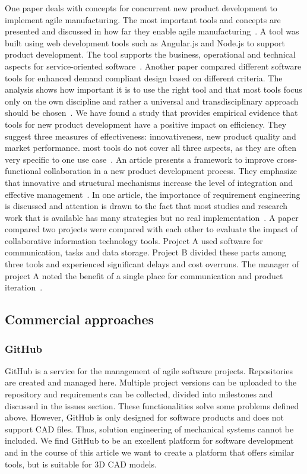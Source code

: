     One paper deals with concepts for concurrent new product development to implement agile manufacturing. The most important tools and concepts are presented and discussed in how far they enable agile manufacturing~\cite{buyukozkan2004survey}.
    A tool was built using web development tools such as Angular.js and Node.js to support product development. The tool supports the business, operational and technical aspects for service-oriented software~\cite{belfadel2022requirements}.
    Another paper compared different software tools for enhanced demand compliant design based on different criteria. The analysis shows how important it is to use the right tool and that most tools focus only on the own discipline and rather a universal and transdisciplinary approach should be chosen~\cite{9447081}.
    We have found a study that provides empirical evidence that tools for new product development have a positive impact on efficiency. They suggest three measures of effectiveness: innovativeness, new product quality and market performance. most tools do not cover all three aspects, as they are often very specific to one use case~\cite{DURMUSOGLU2011321}.
    An article presents a framework to improve cross-functional collaboration in a new product development process. They emphasize that innovative and structural mechanisms increase the level of integration and effective management~\cite{Jassawalla}.
    In one article, the importance of requirement engineering is discussed and attention is drawn to the fact that most studies and research work that is available has many strategies but no real implementation~\cite{kumar2022requirements}.
    A paper compared two projects were compared with each other to evaluate the impact of collaborative information technology tools. Project A used software for communication, tasks and data storage. Project B divided these parts among three tools and experienced significant delays and cost overruns. The manager of project A noted the benefit of a single place for communication and product iteration~\cite{marion_fixson_2019}.

    \subsection*{Commercial approaches}
    \label{sec:commercial}

    \subsubsection*{GitHub}
    GitHub is a service for the management of agile software projects. Repositories are created and managed here. Multiple project versions can be uploaded to the repository and requirements can be collected, divided into milestones and discussed in the issues section. These functionalities solve some problems defined above. However, GitHub is only designed for software products and does not support CAD files. Thus, solution engineering of mechanical systems cannot be included. We find GitHub to be an excellent platform for software development and in the course of this article we want to create a platform that offers similar tools, but is suitable for 3D CAD models.

